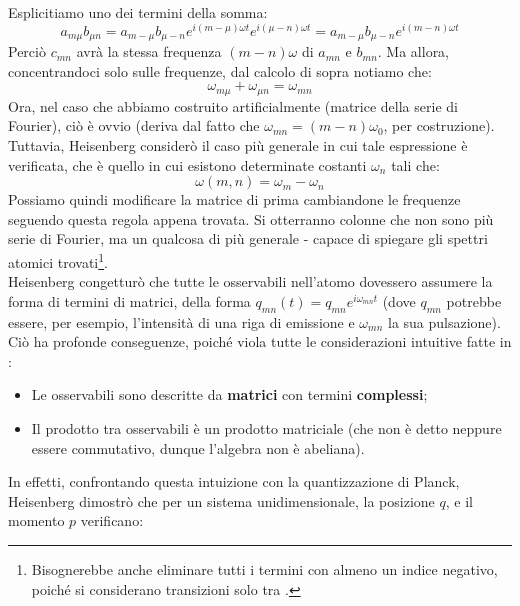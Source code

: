 \documentclass[FisicaTeorica.tex]{subfiles}
\begin{document}
Esplicitiamo uno dei termini della somma:
\[
a_{m\mu}b_{\mu n} = a_{m-\mu}b_{\mu-n}e^{i(m-\mu) \omega t} e^{i(\mu-n)\omega t} = a_{m-\mu} b_{\mu-n}e^{i(m-n)\omega t} %
\]
Perciò $c_{mn}$ avrà la stessa frequenza $(m-n)\omega$ di $a_{mn}$ e $b_{mn}$. Ma allora, concentrandoci solo sulle frequenze, dal calcolo di sopra notiamo che:
\[
\omega_{m\mu} + \omega_{\mu n} = \omega_{m n}
\]
Ora, nel caso che abbiamo costruito artificialmente (matrice della serie di Fourier), ciò è ovvio (deriva dal fatto che $\omega_{mn} = (m-n)\omega_0$, per costruzione). Tuttavia, Heisenberg considerò il caso più generale in cui tale espressione è verificata, che è quello in cui esistono determinate costanti $\omega_n$ tali che:
\[
\omega(m,n) = \omega_{m} - \omega_n
\]
Possiamo quindi modificare la matrice di prima cambiandone le frequenze seguendo questa regola appena trovata. Si otterranno colonne che non sono più serie di Fourier, ma un qualcosa di più generale - capace di spiegare gli spettri atomici trovati\footnote{Bisognerebbe anche eliminare tutti i termini con almeno un indice negativo, poiché si considerano transizioni solo tra .}.\\
Heisenberg congetturò che tutte le osservabili nell'atomo dovessero assumere la forma di termini di matrici, della forma $q_{mn}(t) = q_{mn}e^{i\omega_{mn}t}$ (dove $q_{mn}$ potrebbe essere, per esempio, l'intensità di una riga di emissione e $\omega_{mn}$ la sua pulsazione).\\
Ciò ha profonde conseguenze, poiché viola tutte le considerazioni intuitive fatte in \MC:
\begin{itemize}
    \item Le osservabili sono descritte da \textbf{matrici} con termini \textbf{complessi};
    \item Il prodotto tra osservabili è un prodotto matriciale (che non è detto neppure essere commutativo, dunque l'algebra non è abeliana).
\end{itemize}
In effetti, confrontando questa intuizione con la quantizzazione di Planck, Heisenberg dimostrò che per un sistema unidimensionale, la posizione $q$, e il momento $p$ verificano:
\end{document}

